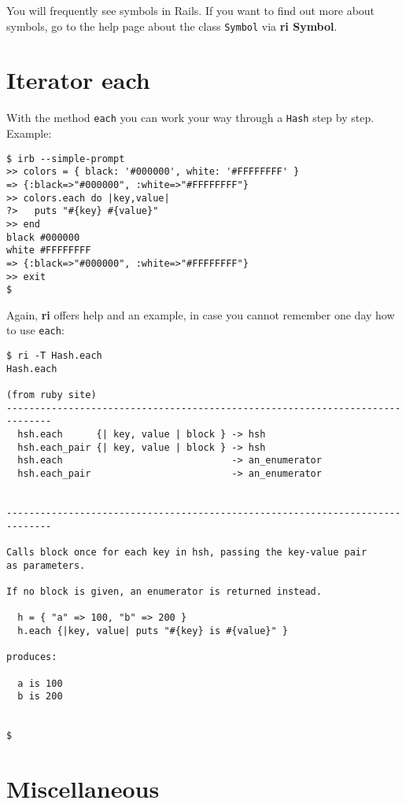 \documentclass[a4paper]{book}
\begin{document}
You will frequently see symbols in Rails. If you want to find out more about symbols, go to the help page about the class \texttt{Symbol} via \textbf{ri Symbol}.

\section{Iterator each}\label{iterator-each-1}

With the method \texttt{each} you can work your way through a \texttt{Hash} step by step. Example:

\begin{shaded}\begin{verbatim}
$ irb --simple-prompt
>> colors = { black: '#000000', white: '#FFFFFFFF' }
=> {:black=>"#000000", :white=>"#FFFFFFFF"}
>> colors.each do |key,value|
?>   puts "#{key} #{value}"
>> end
black #000000
white #FFFFFFFF
=> {:black=>"#000000", :white=>"#FFFFFFFF"}
>> exit
$
\end{verbatim}\end{shaded}

Again, \textbf{ri} offers help and an example, in case you cannot remember one day how to use \texttt{each}:

\begin{shaded}\begin{verbatim}
$ ri -T Hash.each
Hash.each

(from ruby site)
------------------------------------------------------------------------------
  hsh.each      {| key, value | block } -> hsh
  hsh.each_pair {| key, value | block } -> hsh
  hsh.each                              -> an_enumerator
  hsh.each_pair                         -> an_enumerator


------------------------------------------------------------------------------

Calls block once for each key in hsh, passing the key-value pair
as parameters.

If no block is given, an enumerator is returned instead.

  h = { "a" => 100, "b" => 200 }
  h.each {|key, value| puts "#{key} is #{value}" }

produces:

  a is 100
  b is 200


$
\end{verbatim}\end{shaded}

\section{Miscellaneous}\label{miscellaneous}
\end{document}

